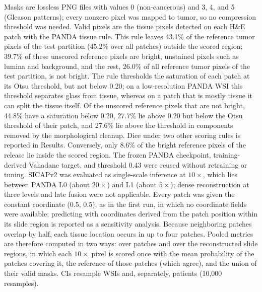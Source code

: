 \documentclass[10pt,letterpaper]{article}
\begin{document}
Masks are lossless PNG files with values 0 (non-cancerous) and 3, 4, and 5 (Gleason patterns); every nonzero pixel was mapped to tumor, so no compression threshold was needed. Valid pixels are the tissue pixels detected on each H\&E patch with the PANDA tissue rule. This rule leaves 43.1\% of the reference tumor pixels of the test partition (45.2\% over all patches) outside the scored region; 39.7\% of these unscored reference pixels are bright, unstained pixels such as lumina and background, and the rest, 26.0\% of all reference tumor pixels of the test partition, is not bright. The rule thresholds the saturation of each patch at its Otsu threshold, but not below 0.20; on a low-resolution PANDA WSI this threshold separates glass from tissue, whereas on a patch that is mostly tissue it can split the tissue itself. Of the unscored reference pixels that are not bright, 44.8\% have a saturation below 0.20, 27.7\% lie above 0.20 but below the Otsu threshold of their patch, and 27.6\% lie above the threshold in components removed by the morphological cleanup. Dice under two other scoring rules is reported in Results. Conversely, only 8.6\% of the bright reference pixels of the release lie inside the scored region. The frozen PANDA checkpoint, training-derived Vahadane target, and threshold 0.43 were reused without retraining or tuning. SICAPv2 was evaluated as single-scale inference at $10\times$, which lies between PANDA L0 (about $20\times$) and L1 (about $5\times$); dense reconstruction at three levels and late fusion were not applicable. Every patch was given the constant coordinate (0.5, 0.5), as in the first run, in which no coordinate fields were available; predicting with coordinates derived from the patch position within its slide region is reported as a sensitivity analysis. Because neighboring patches overlap by half, each tissue location occurs in up to four patches. Pooled metrics are therefore computed in two ways: over patches and over the reconstructed slide regions, in which each $10\times$ pixel is scored once with the mean probability of the patches covering it, the reference of those patches (which agree), and the union of their valid masks. CIs resample WSIs and, separately, patients (10,000 resamples).
\end{document}
